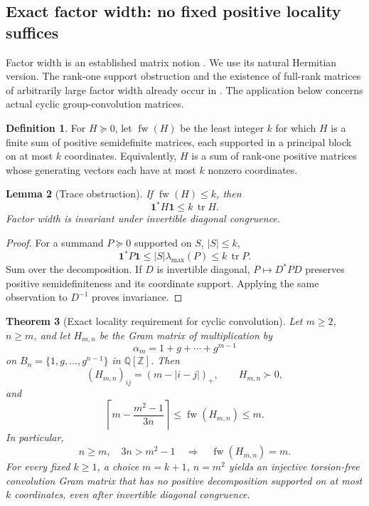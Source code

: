 \documentclass[11pt,a4paper,oneside]{report}
\newtheorem{theorem}{Theorem}[section]
\newtheorem{lemma}[theorem]{Lemma}
\theoremstyle{definition}
\newtheorem{definition}[theorem]{Definition}
\theoremstyle{remark}
\DeclareMathOperator{\tr}{tr}
\DeclareMathOperator{\FW}{fw}
\newcommand{\Q}{\mathbb Q}
\newcommand{\Z}{\mathbb Z}
\newcommand{\one}{\mathbf 1}
\begin{document}
\subsection{Exact factor width: no fixed positive locality suffices}
Factor width is an established matrix notion \cite{B:BCPT}. We use its natural Hermitian version. The rank-one support obstruction and the existence of full-rank matrices of arbitrarily large factor width already occur in \cite[Proposition 3 and its following remark]{B:BCPT}. The application below concerns actual cyclic group-convolution matrices.
\begin{definition}
For \(H\succeq0\), let \(\FW(H)\) be the least integer \(k\) for which \(H\) is a finite sum of positive semidefinite matrices, each supported in a principal block on at most \(k\) coordinates. Equivalently, \(H\) is a sum of rank-one positive matrices whose generating vectors each have at most \(k\) nonzero coordinates.
\end{definition}
\begin{lemma}[Trace obstruction]\label{M02:lem:fwtrace}
If \(\FW(H)\le k\), then
\begin{equation}\label{M02:eq:fwtrace}
\one^*H\one\le k\,\tr H.
\end{equation}
Factor width is invariant under invertible diagonal congruence.
\end{lemma}
\begin{proof}
For a summand \(P\succeq0\) supported on \(S\), \(|S|\le k\),
\[
\one^*P\one
\le |S|\lambda_{\max}(P)
\le k\,\tr P.
\]
Sum over the decomposition. If \(D\) is invertible diagonal, \(P\mapsto D^*PD\) preserves positive semidefiniteness and its coordinate support. Applying the same observation to \(D^{-1}\) proves invariance.
\end{proof}
\begin{theorem}[Exact locality requirement for cyclic convolution]\label{M02:thm:factorwidth}
Let \(m\ge2\), \(n\ge m\), and let \(H_{m,n}\) be the Gram matrix of multiplication by
\[
\alpha_m=1+g+\cdots+g^{m-1}
\]
on \(B_n=\{1,g,\ldots,g^{n-1}\}\) in \(\Q[\Z]\). Then
\[
(H_{m,n})_{ij}=(m-|i-j|)_+,\qquad H_{m,n}\succ0,
\]
and
\begin{equation}\label{M02:eq:fwbound}
\left\lceil m-\frac{m^2-1}{3n}\right\rceil
\le\FW(H_{m,n})\le m.
\end{equation}
In particular,
\begin{equation}\label{M02:eq:fwexact}
\boxed{\quad n\ge m,\quad 3n>m^2-1
\quad\Longrightarrow\quad \FW(H_{m,n})=m.\quad}
\end{equation}
For every fixed \(k\ge1\), a choice \(m=k+1\), \(n=m^2\) yields an injective torsion-free convolution Gram matrix that has no positive decomposition supported on at most \(k\) coordinates, even after invertible diagonal congruence.
\end{theorem}
\end{document}
